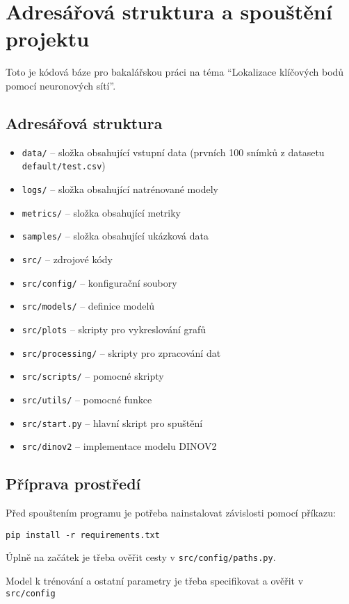 \chapter{Adresářová struktura a spouštění projektu}
Toto je kódová báze pro bakalářskou práci na téma ``Lokalizace klíčových bodů pomocí neuronových sítí''.

\section{Adresářová struktura}
\begin{itemize}
    \item \texttt{data/} -- složka obsahující vstupní data (prvních 100 snímků z datasetu \texttt{default/test.csv})
    \item \texttt{logs/} -- složka obsahující natrénované modely
    \item \texttt{metrics/} -- složka obsahující metriky
    \item \texttt{samples/} -- složka obsahující ukázková data
    \item \texttt{src/} -- zdrojové kódy
    \item \texttt{src/config/} -- konfigurační soubory
    \item \texttt{src/models/} -- definice modelů
    \item \texttt{src/plots} -- skripty pro vykreslování grafů
    \item \texttt{src/processing/} -- skripty pro zpracování dat
    \item \texttt{src/scripts/} -- pomocné skripty
    \item \texttt{src/utils/} -- pomocné funkce
    \item \texttt{src/start.py} -- hlavní skript pro spuštění
    \item \texttt{src/dinov2} -- implementace modelu DINOV2
\end{itemize}

\section{Příprava prostředí}
Před spouštením programu je potřeba nainstalovat závislosti pomocí příkazu:
\begin{verbatim}
pip install -r requirements.txt
\end{verbatim}
Úplně na začátek je třeba ověřit cesty v \texttt{src/config/paths.py}.

Model k trénování a ostatní parametry je třeba specifikovat a ověřit v \texttt{src/config}

